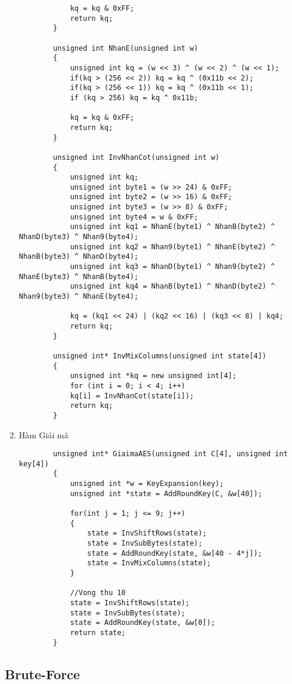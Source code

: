 \begin{enumerate}
\begin{verbatim}
			kq = kq & 0xFF;
			return kq;
		}
		
		unsigned int NhanE(unsigned int w)
		{
			unsigned int kq = (w << 3) ^ (w << 2) ^ (w << 1);
			if(kq > (256 << 2)) kq = kq ^ (0x11b << 2);
			if(kq > (256 << 1)) kq = kq ^ (0x11b << 1);
			if (kq > 256) kq = kq ^ 0x11b;
			
			kq = kq & 0xFF;
			return kq;
		}
		
		unsigned int InvNhanCot(unsigned int w)
		{
			unsigned int kq;
			unsigned int byte1 = (w >> 24) & 0xFF;
			unsigned int byte2 = (w >> 16) & 0xFF;
			unsigned int byte3 = (w >> 8) & 0xFF;
			unsigned int byte4 = w & 0xFF;
			unsigned int kq1 = NhanE(byte1) ^ NhanB(byte2) ^ NhanD(byte3) ^ Nhan9(byte4);
			unsigned int kq2 = Nhan9(byte1) ^ NhanE(byte2) ^ NhanB(byte3) ^ NhanD(byte4);
			unsigned int kq3 = NhanD(byte1) ^ Nhan9(byte2) ^ NhanE(byte3) ^ NhanB(byte4);
			unsigned int kq4 = NhanB(byte1) ^ NhanD(byte2) ^ Nhan9(byte3) ^ NhanE(byte4);
			
			kq = (kq1 << 24) | (kq2 << 16) | (kq3 << 8) | kq4;
			return kq;
		}
		
		unsigned int* InvMixColumns(unsigned int state[4])
		{
			unsigned int *kq = new unsigned int[4];
			for (int i = 0; i < 4; i++) 
			kq[i] = InvNhanCot(state[i]);
			return kq;
		}
	\end{verbatim}
	\item Hàm Giải mã
	\begin{verbatim}
		unsigned int* GiaimaAES(unsigned int C[4], unsigned int key[4])
		{
			unsigned int *w = KeyExpansion(key);
			unsigned int *state = AddRoundKey(C, &w[40]); 
			
			for(int j = 1; j <= 9; j++)
			{
				state = InvShiftRows(state);
				state = InvSubBytes(state);
				state = AddRoundKey(state, &w[40 - 4*j]);
				state = InvMixColumns(state);
			}
			
			//Vong thu 10
			state = InvShiftRows(state);
			state = InvSubBytes(state);
			state = AddRoundKey(state, &w[0]); 
			return state;
		}
	\end{verbatim}
\end{enumerate}
\subsection{Brute-Force}
